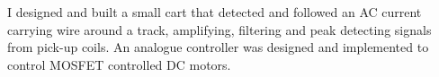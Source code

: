 \descript{ }
\vspace*{-\topsep}  %
\begin{justify}
I designed and built a small cart that detected and followed an AC current carrying wire around a track, amplifying, filtering and peak detecting signals from pick-up coils. An analogue controller was designed and implemented to control MOSFET controlled DC motors.
\end{justify}
